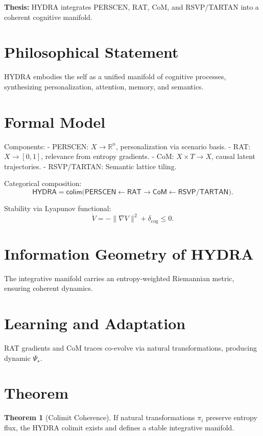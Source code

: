 \documentclass[12pt]{book}
\theoremstyle{definition}
\newtheorem{theorem}{Theorem}[chapter]
\begin{document}
\textbf{Thesis:} HYDRA integrates PERSCEN, RAT, CoM, and RSVP/TARTAN into a coherent cognitive manifold.

\section{Philosophical Statement}
HYDRA embodies the self as a unified manifold of cognitive processes, synthesizing personalization, attention, memory, and semantics.

\section{Formal Model}
Components:
- \textsf{PERSCEN}: \(X \to \mathbb{R}^n\), personalization via scenario basis.
- \textsf{RAT}: \(X \to [0,1]\), relevance from entropy gradients.
- \textsf{CoM}: \(X \times T \to X\), causal latent trajectories.
- \textsf{RSVP/TARTAN}: Semantic lattice tiling.

Categorical composition:
\begin{equation}
\textsf{HYDRA} = \textsf{colim}\Big( \textsf{PERSCEN} \xleftarrow{} \textsf{RAT} \xrightarrow{} \textsf{CoM} \xleftarrow{} \textsf{RSVP/TARTAN} \Big).
\end{equation}

Stability via Lyapunov functional:
\begin{equation}
\dot{V} = -\|\nabla V\|^2 + \delta_{\text{cog}} \leq 0.
\end{equation}

\section{Information Geometry of HYDRA}
The integrative manifold carries an entropy-weighted Riemannian metric, ensuring coherent dynamics.

\section{Learning and Adaptation}
RAT gradients and CoM traces co-evolve via natural transformations, producing dynamic \(\Psi_\star\).

\section{Theorem}
\begin{theorem}[Colimit Coherence]
\label{thm:colimit_coherence}
If natural transformations \(\pi_i\) preserve entropy flux, the HYDRA colimit exists and defines a stable integrative manifold.
\end{theorem}
\end{document}
